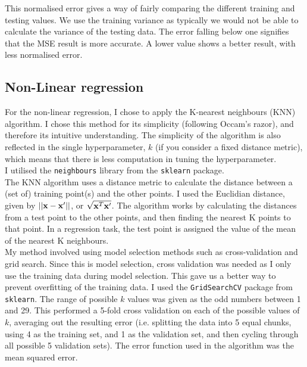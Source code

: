 \documentclass{scrartcl}
\begin{document}
This normalised error gives a way of fairly comparing the different training and testing values. We use the training variance as typically we would not be able to calculate the variance of the testing data. The error falling below one signifies that the MSE result is more accurate. A lower value shows a better result, with less normalised error.

\subsection{Non-Linear regression}

For the non-linear regression, I chose to apply the K-nearest neighbours (KNN) algorithm. I chose this method for its simplicity (following Occam's razor), and therefore its intuitive understanding. The simplicity of the algorithm is also reflected in the single hyperparameter, $k$ (if you consider a fixed distance metric), which means that there is less computation in tuning the hyperparameter. \\

I utilised the \texttt{neighbours} library from the \texttt{sklearn} package. \\

The KNN algorithm uses a distance metric to calculate the distance between a (set of) training point(s) and the other points. I used the Euclidian distance, given by $ || {\mathbf x} - {\mathbf x}' || $, or $ \sqrt {{\mathbf x}^T {\mathbf x}' } $. The algorithm works by calculating the distances from a test point to the other points, and then finding the nearest K points to that point. In a regression task, the test point is assigned the value of the mean of the nearest K neighbours. \\

My method involved using model selection methods such as cross-validation and grid search. Since this is model selection, cross validation was needed as I only use the training data during model selection. This gave us a better way to prevent overfitting of the training data. I used the \texttt{GridSearchCV} package from \texttt{sklearn}. The range of possible $k$ values was given as the odd numbers between 1 and 29. This performed a 5-fold cross validation on each of the possible values of $k$, averaging out the resulting error (i.e. splitting the data into 5 equal chunks, using 4 as the training set, and 1 as the validation set, and then cycling through all possible 5 validation sets). The error function used in the algorithm was the mean squared error.\\
\end{document}
